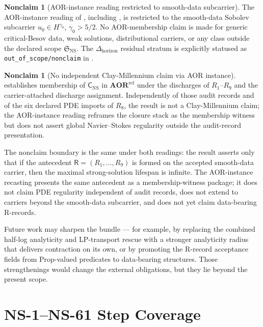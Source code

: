 \documentclass[11pt]{article}
\theoremstyle{definition}
\newtheorem{nonclaim}[theorem]{Nonclaim}
\begin{document}
\begin{nonclaim}[AOR-instance reading restricted to smooth-data subcarrier]\label{nonclaim:ns:aor-instance-smooth-data-only}
The AOR-instance reading of , including , is restricted to the smooth-data Sobolev subcarrier $u_0\in H^{\gamma_0}$, $\gamma_0>5/2$.  No AOR-membership claim is made for generic critical-Besov data, weak solutions, distributional carriers, or any class outside the declared scope $\mathfrak S_{\mathrm{NS}}$.  The $\Delta_{\mathrm{horizon}}$ residual stratum is explicitly statused as \texttt{out\_of\_scope/nonclaim} in .
\end{nonclaim}

\begin{nonclaim}[No independent Clay-Millennium claim via AOR instance]\label{nonclaim:ns:aor-instance-no-clay-claim}
 establishes membership of $\mathsf C_{\mathrm{NS}}$ in $\mathbf{AOR}^{\mathrm{ref}}$ under the discharges of $R_1$--$R_9$ and the carrier-attached discharge assignment.  Independently of those audit records and of the six declared PDE imports of $R_8$, the result is not a Clay-Millennium claim; the AOR-instance reading reframes the closure stack as the membership witness but does not assert global Navier--Stokes regularity outside the audit-record presentation.
\end{nonclaim}

The nonclaim boundary is the same under both readings: the result
asserts only that if the antecedent \(\mathsf R=(R_1,\ldots,R_9)\) is
formed on the accepted smooth-data carrier, then the maximal
strong-solution lifespan is infinite.  The AOR-instance recasting
presents the same antecedent as a membership-witness package; it does
not claim PDE regularity independent of audit records, does not extend
to carriers beyond the smooth-data subcarrier, and does not yet claim
data-bearing R-records.

Future work may sharpen the bundle --- for example, by replacing the
combined half-log analyticity and LP-transport rescue with a stronger
analyticity radius that delivers contraction on its own, or by
promoting the R-record acceptance fields from \(\mathrm{Prop}\)-valued
predicates to data-bearing structures.  Those strengthenings would
change the external obligations, but they lie beyond the present scope.

 
\appendix


\section{NS-1--NS-61 Step Coverage}
\label{app:step-coverage}
\end{document}
